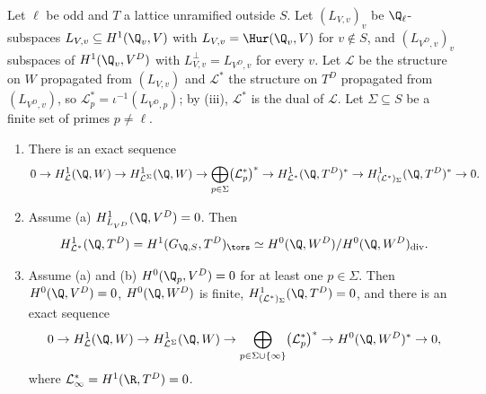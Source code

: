 \begin{theorem}\label{thm:galcoh:relaxing-sigma}
Let $\ell$ be odd and $T$ a lattice unramified outside $S$. Let $(L_{V,v})_v$ be $\Q_\ell$-subspaces $L_{V,v}\subseteq H^1(\Q_v,V)$ with $L_{V,v}=\Hur(\Q_v,V)$ for $v\notin S$, and
$(L_{V^D,v})_v$ subspaces of $H^1(\Q_v,V^D)$ with $L_{V,v}^\perp=L_{V^D,v}$ for every $v$. Let $\mathcal L$ be the structure on $W$ propagated from $(L_{V,v})$ and $\mathcal L^*$ the structure
on $T^D$ propagated from $(L_{V^D,v})$, so $\mathcal L^*_p=\iota^{-1}(L_{V^D,p})$; by (iii), $\mathcal L^*$ is the dual of $\mathcal L$. Let $\Sigma\subseteq S$ be a finite
set of primes $p\ne\ell$.
\begin{enumerate}[label=(\roman*)]
\item There is an exact sequence
\[
0\to H^1_{\mathcal L}(\Q,W)\to H^1_{\mathcal L^\Sigma}(\Q,W)\to\bigoplus_{p\in\Sigma}\bigl(\mathcal L^*_p\bigr)^*\to H^1_{\mathcal L^*}(\Q,T^D)^*\to H^1_{(\mathcal L^*)_\Sigma}(\Q,T^D)^*\to0 .
\]
\item Assume (a) $H^1_{L_{V^D}}(\Q,V^D)=0$. Then
\[
H^1_{\mathcal L^*}(\Q,T^D)=H^1(G_{\Q,S},T^D)_{\tors}\simeq H^0(\Q,W^D)/H^0(\Q,W^D)_{\mathrm{div}}.
\]
\item Assume (a) and (b) $H^0(\Q_p,V^D)=0$ for at least one $p\in\Sigma$. Then $H^0(\Q,V^D)=0$, $H^0(\Q,W^D)$ is finite, $H^1_{(\mathcal L^*)_\Sigma}(\Q,T^D)=0$, and there is an exact
sequence
\[
0\to H^1_{\mathcal L}(\Q,W)\to H^1_{\mathcal L^\Sigma}(\Q,W)\to\bigoplus_{p\in\Sigma\cup\{\infty\}}\bigl(\mathcal L^*_p\bigr)^*\to H^0(\Q,W^D)^*\to0,
\]
where $\mathcal L^*_\infty=H^1(\R,T^D)=0$.
\end{enumerate}
\end{theorem}


